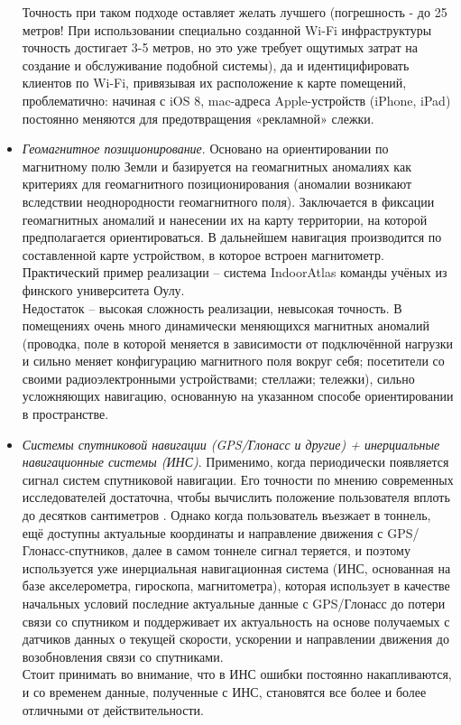 \begin{itemize}
    Точность при таком подходе оставляет желать лучшего (погрешность - до 25 метров! При использовании специально созданной Wi-Fi инфраструктуры точность достигает 3-5 метров, но это уже требует ощутимых затрат на создание и обслуживание подобной системы), да и идентицифировать клиентов по Wi-Fi, привязывая их расположение к карте помещений, проблематично: начиная с iOS 8, mac-адреса Apple-устройств (iPhone, iPad) постоянно меняются для предотвращения «рекламной» слежки.
    \item
    \textit{Геомагнитное позиционирование}. Основано на ориентировании по магнитному полю Земли и базируется на геомагнитных аномалиях как критериях для геомагнитного позиционирования (аномалии возникают вследствии неоднородности геомагнитного поля). Заключается в фиксации геомагнитных аномалий и нанесении их на карту территории, на которой предполагается ориентироваться. В дальнейшем навигация производится по составленной карте устройством, в которое встроен магнитометр. Практический пример реализации – система IndoorAtlas команды учёных из финского университета Оулу. \\
    Недостаток – высокая сложность реализации, невысокая точность. В помещениях очень много динамически меняющихся магнитных аномалий (проводка, поле в которой меняется в зависимости от подключённой нагрузки и сильно меняет конфигурацию магнитного поля вокруг себя; посетители со своими радиоэлектронными устройствами; стеллажи; тележки), сильно усложняющих навигацию, основанную на указанном способе ориентировании в пространстве.
    \item
    \textit{Системы спутниковой навигации (GPS/Глонасс и другие) + инерциальные навигационные системы (ИНС)}. Применимо, когда периодически появляется сигнал систем спутниковой навигации. Его точности по мнению современных исследователей достаточна, чтобы вычислить положение пользователя вплоть до десятков сантиметров \cite{web:GPScent}. Однако когда пользователь въезжает в тоннель, ещё доступны актуальные координаты и направление движения с GPS/Глонасс-спут\-ни\-ков, далее в самом тоннеле сигнал теряется, и поэтому используется уже инерциальная навигационная система (ИНС, основанная на базе акселерометра, гироскопа, магнитометра), которая использует в качестве начальных условий последние актуальные данные с GPS/Глонасс до потери связи со спутником и поддерживает их актуальность на основе получаемых с датчиков данных о текущей скорости, ускорении и направлении движения до возобновления связи со спутниками. \\
    Стоит принимать во внимание, что в ИНС ошибки постоянно накапливаются, и со временем данные, полученные с ИНС, становятся все более и более отличными от действительности.

\end{itemize}
